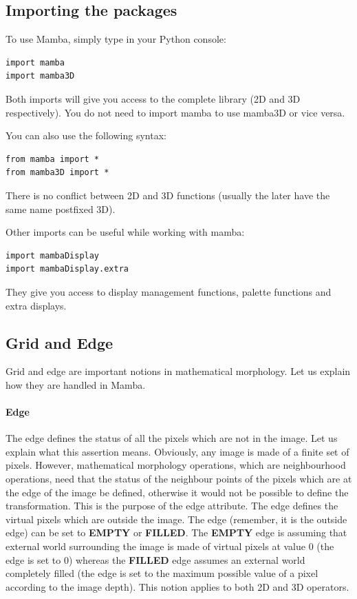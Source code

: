 \documentclass[a4paper,10pt,oneside]{article}
\begin{document}
\subsection{Importing the packages}

To use Mamba, simply type in your Python console:

\lstset{language=Python}
\begin{lstlisting}
import mamba
import mamba3D
\end{lstlisting}

Both imports will give you access to the complete library (2D and 3D respectively).
You do not need to import mamba to use mamba3D or vice versa.

You can also use the following syntax:

\lstset{language=Python}
\begin{lstlisting}
from mamba import *
from mamba3D import *
\end{lstlisting}

There is no conflict between 2D and 3D functions (usually the later have the
same name postfixed 3D).

Other imports can be useful while working with mamba:

\lstset{language=Python}
\begin{lstlisting}
import mambaDisplay
import mambaDisplay.extra
\end{lstlisting}

They give you access to display management functions, palette functions and
extra displays.

\subsection{Grid and Edge}

Grid and edge are important notions in mathematical morphology. Let us explain
how they are handled in Mamba. 

\paragraph{Edge}

The edge defines the status of all the pixels which are not in the image. Let us 
explain what this assertion means. Obviously, any image is made of a finite set 
of pixels. However, mathematical morphology operations, which are neighbourhood 
operations, need that the status of the neighbour points of the pixels which are at 
the edge of the image be defined, otherwise it would not be possible to define the 
transformation. This is the purpose of the edge attribute. The edge defines the 
virtual pixels which are outside the image. The edge (remember, it is the outside 
edge) can be set to \textbf{EMPTY} or \textbf{FILLED}. The \textbf{EMPTY} edge
is assuming that external world surrounding 
the image is made of virtual pixels at value 0 (the edge is set to 0) whereas 
the \textbf{FILLED} edge assumes an external world completely filled 
(the edge is set to the maximum possible value of a pixel according to the image 
depth). This notion applies to both 2D and 3D operators.
\end{document}
